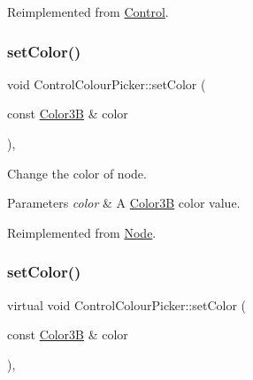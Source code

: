 Reimplemented from \hyperlink{classControl_a0cf2e20cea5b57b263e965be4a19ab52}{Control}.

\mbox{\label{classControlColourPicker_af83da2a45dd64f202132830729711513}} 
\subsubsection{\texorpdfstring{set\+Color()}{setColor()}\hspace{0.1cm}{\footnotesize\ttfamily [1/2]}}
{\footnotesize\ttfamily void Control\+Colour\+Picker\+::set\+Color (\begin{DoxyParamCaption}\item[{const \hyperlink{structColor3B}{Color3B} \&}]{color }\end{DoxyParamCaption})\hspace{0.3cm}{\ttfamily [override]}, {\ttfamily [virtual]}}

Change the color of node. 
\begin{DoxyParams}{Parameters}
{\em color} & A \hyperlink{structColor3B}{Color3B} color value. \\
\hline
\end{DoxyParams}


Reimplemented from \hyperlink{classNode_af45037de5b13602263b1ce51b50cafdd}{Node}.

\mbox{\label{classControlColourPicker_a23536124c2fbdad9fb93b0de8bf9b85e}} 
\subsubsection{\texorpdfstring{set\+Color()}{setColor()}\hspace{0.1cm}{\footnotesize\ttfamily [2/2]}}
{\footnotesize\ttfamily virtual void Control\+Colour\+Picker\+::set\+Color (\begin{DoxyParamCaption}\item[{const \hyperlink{structColor3B}{Color3B} \&}]{color }\end{DoxyParamCaption})\hspace{0.3cm}{\ttfamily [override]}, {\ttfamily [virtual]}}

